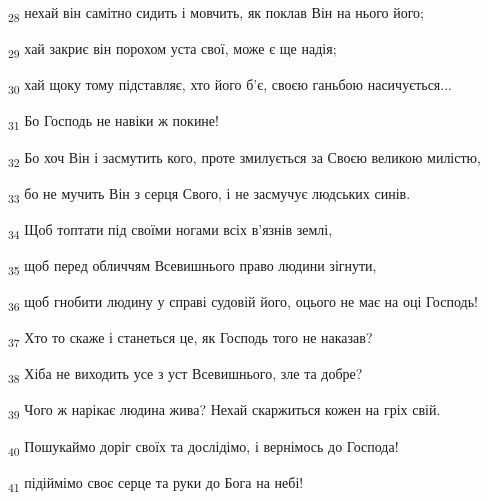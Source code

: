 \begin{tcolorbox}
\textsubscript{28} нехай він самітно сидить і мовчить, як поклав Він на нього його;
\end{tcolorbox}
\begin{tcolorbox}
\textsubscript{29} хай закриє він порохом уста свої, може є ще надія;
\end{tcolorbox}
\begin{tcolorbox}
\textsubscript{30} хай щоку тому підставляє, хто його б'є, своєю ганьбою насичується...
\end{tcolorbox}
\begin{tcolorbox}
\textsubscript{31} Бо Господь не навіки ж покине!
\end{tcolorbox}
\begin{tcolorbox}
\textsubscript{32} Бо хоч Він і засмутить кого, проте змилується за Своєю великою милістю,
\end{tcolorbox}
\begin{tcolorbox}
\textsubscript{33} бо не мучить Він з серця Свого, і не засмучує людських синів.
\end{tcolorbox}
\begin{tcolorbox}
\textsubscript{34} Щоб топтати під своїми ногами всіх в'язнів землі,
\end{tcolorbox}
\begin{tcolorbox}
\textsubscript{35} щоб перед обличчям Всевишнього право людини зігнути,
\end{tcolorbox}
\begin{tcolorbox}
\textsubscript{36} щоб гнобити людину у справі судовій його, оцього не має на оці Господь!
\end{tcolorbox}
\begin{tcolorbox}
\textsubscript{37} Хто то скаже і станеться це, як Господь того не наказав?
\end{tcolorbox}
\begin{tcolorbox}
\textsubscript{38} Хіба не виходить усе з уст Всевишнього, зле та добре?
\end{tcolorbox}
\begin{tcolorbox}
\textsubscript{39} Чого ж нарікає людина жива? Нехай скаржиться кожен на гріх свій.
\end{tcolorbox}
\begin{tcolorbox}
\textsubscript{40} Пошукаймо доріг своїх та дослідімо, і вернімось до Господа!
\end{tcolorbox}
\begin{tcolorbox}
\textsubscript{41} підіймімо своє серце та руки до Бога на небі!
\end{tcolorbox}
